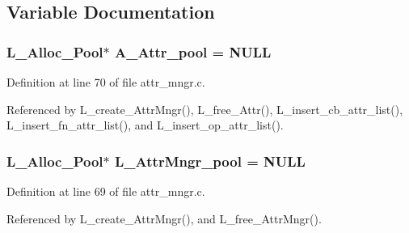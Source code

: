 \subsection{Variable Documentation}
\subsubsection{\setlength{\rightskip}{0pt plus 5cm}\bf{L\_\-Alloc\_\-Pool}$\ast$ \bf{A\_\-Attr\_\-pool} = NULL}\label{attr__mngr_8c_1bfb818ee7431941a6ab1b30468f69fd}




Definition at line 70 of file attr\_\-mngr.c.

Referenced by L\_\-create\_\-Attr\-Mngr(), L\_\-free\_\-Attr(), L\_\-insert\_\-cb\_\-attr\_\-list(), L\_\-insert\_\-fn\_\-attr\_\-list(), and L\_\-insert\_\-op\_\-attr\_\-list().
\subsubsection{\setlength{\rightskip}{0pt plus 5cm}\bf{L\_\-Alloc\_\-Pool}$\ast$ \bf{L\_\-Attr\-Mngr\_\-pool} = NULL}\label{attr__mngr_8c_e8f3a3f53cf2026ef1fae8a922cc4456}




Definition at line 69 of file attr\_\-mngr.c.

Referenced by L\_\-create\_\-Attr\-Mngr(), and L\_\-free\_\-Attr\-Mngr().
